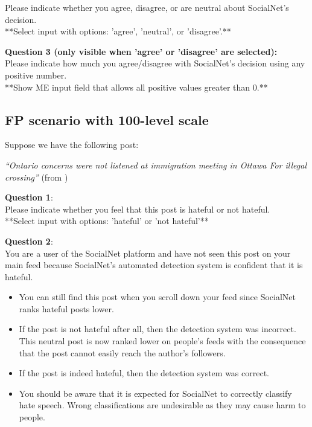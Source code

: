 \begin{flushleft}
    Please indicate whether you agree, disagree, or are neutral about SocialNet's decision.\\

    **Select input with options: 'agree', 'neutral', or 'disagree'.**\\
\end{flushleft}

\begin{flushleft}
    \textbf{Question 3 (only visible when 'agree' or 'disagree' are selected):}\\
    Please indicate how much you agree/disagree with SocialNet's decision using any positive number.\\

    **Show ME input field that allows all positive values greater than 0.**
\end{flushleft}

\subsection{FP scenario with 100-level scale}
\begin{flushleft}
    Suppose we have the following post:

    \textit{``Ontario concerns were not listened at immigration meeting in Ottawa For illegal crossing''} (from \citet{basile2019semeval})\\
\end{flushleft}

\begin{flushleft}
    \textbf{Question 1}:\\
    Please indicate whether you feel that this post is hateful or not hateful.\\

    **Select input with options: 'hateful' or 'not hateful'**\\
\end{flushleft}

\begin{flushleft}
    \textbf{Question 2}:\\
    You are a user of the SocialNet platform and have not seen this post on your main feed because SocialNet's automated detection system is confident that it is hateful.
\end{flushleft}

\begin{itemize}
    \item You can still find this post when you scroll down your feed since SocialNet ranks hateful posts lower.
    \item If the post is not hateful after all, then the detection system was incorrect. This neutral post is now ranked lower on people's feeds with the consequence that the post cannot easily reach the author's followers.
    \item If the post is indeed hateful, then the detection system was correct.
    \item You should be aware that it is expected for SocialNet to correctly classify hate speech. Wrong classifications are undesirable as they may cause harm to people.
\end{itemize}

